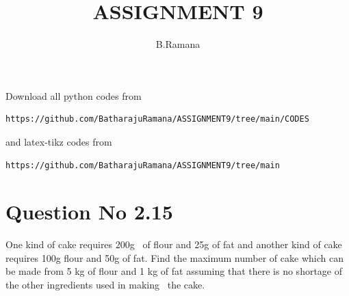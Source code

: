 \documentclass[journal,12pt,twocolumn]{IEEEtran}
\begin{document}
     \def\rightbox#1{\makebox[0in][r]{#1}}
     \def\centbox#1{\makebox[0in]{#1}}
     \def\topbox#1{\raisebox{-\baselineskip}[0in][0in]{#1}}
     \def\midbox#1{\raisebox{-0.5\baselineskip}[0in][0in]{#1}}
\vspace{3cm}
\title{ASSIGNMENT 9}
\author{B.Ramana}
\maketitle
\newpage
\bigskip
\renewcommand{\thefigure}{\theenumi}
\renewcommand{\thetable}{\theenumi}
Download all python codes from 
\begin{lstlisting}
https://github.com/BatharajuRamana/ASSIGNMENT9/tree/main/CODES
\end{lstlisting}
%
and latex-tikz codes from 
%
\begin{lstlisting}
https://github.com/BatharajuRamana/ASSIGNMENT9/tree/main
\end{lstlisting}
%
\section{Question No 2.15}
One kind of cake requires 200g  of flour and 25g of fat and another kind of cake requires 100g flour and 50g of fat. Find the maximum number of cake which can be made from 5 kg of flour and 1 kg of fat assuming that there is no shortage of the other ingredients used in making  the cake.
%
\end{document}
